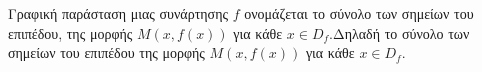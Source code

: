 Γραφική παράσταση μιας συνάρτησης $ f $ ονομάζεται το σύνολο των σημείων του επιπέδου, της μορφής $ M(x,f(x)) $ για κάθε $ x\in D_f $.Δηλαδή το σύνολο των σημείων του επιπέδου της μορφής $ M(x,f(x)) $ για κάθε $ x\in D_f $.
